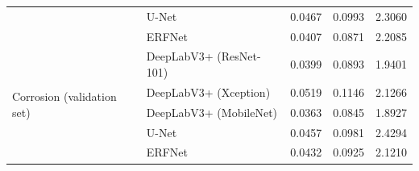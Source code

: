 \documentclass[journal]{IEEEtran}
\begin{document}
\begin{table}[t]
\begin{tabular}{p{1.5cm}p{5cm}p{2cm}p{2cm}p{2cm}}
        & U-Net                               & 0.0467       & 0.0993       & 2.3060                  \\
        & ERFNet                              & 0.0407       & 0.0871       & 2.2085                  \\
        \midrule 
        \multirow{5}{1.5cm}{Corrosion (validation set)}
        & DeepLabV3+ (ResNet-101)             & 0.0399       & 0.0893       & 1.9401                  \\
        & DeepLabV3+ (Xception)               & 0.0519       & 0.1146       & 2.1266                  \\
        & DeepLabV3+ (MobileNet)              & 0.0363       & 0.0845       & 1.8927                  \\
        & U-Net                               & 0.0457       & 0.0981       & 2.4294                  \\
        & ERFNet                              & 0.0432       & 0.0925       & 2.1210                  \\
        \bottomrule
    \end{tabular}
\end{table}
\end{document}

